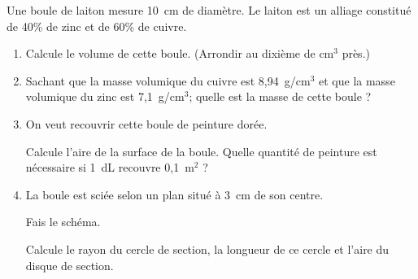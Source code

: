 
Une boule de laiton mesure 10~cm de diamètre. Le laiton est un alliage
constitué de 40\% de zinc et de 60\% de cuivre.
\begin{enumerate}
  \item Calcule le volume de cette boule. (Arrondir au dixième de
    cm$^3$ près.)
  \item Sachant que la masse volumique du cuivre est 8,94~g/cm$^3$ et
    que la masse volumique du zinc est 7,1~g/cm$^3$; quelle est la
    masse de cette boule ?
  \item On veut recouvrir cette boule de peinture dorée.\par Calcule
    l'aire de la surface de la boule. Quelle quantité de peinture est
    nécessaire si 1~dL recouvre 0,1~m$^2$ ?
  \item La boule est sciée selon un plan situé à 3~cm de son
    centre.\par Fais le schéma.\par Calcule le rayon du cercle de
    section, la longueur de ce cercle et l'aire du disque de section.
\end{enumerate}

